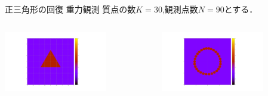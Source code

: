 \documentclass[dvipdfmx]{beamer}
\begin{document}
\begin{frame}{正三角形の回復 重力観測}
  質点の数$K=30$,観測点数$N=90$とする．
  \begin{columns}
    \centering
    \begin{column}[b]{0.48\columnwidth}
      \centering
      \includegraphics[width=4.5cm]{fig/triangle.png}
    \end{column}
    \hspace{-3cm}
    \begin{column}[b]{0.48\columnwidth}
      \centering
      \includegraphics[width=4.5cm]{fig/GR6N90K30E4.png}
    \end{column}
  \end{columns}


\end{frame}
\end{document}
